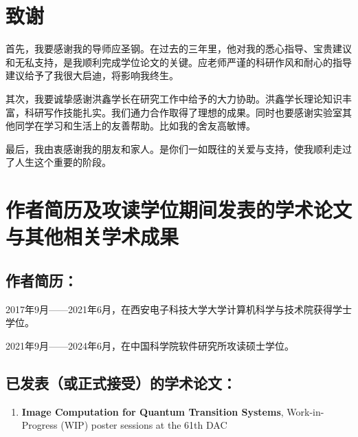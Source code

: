 \chapter[致谢]{致\quad 谢}%

首先，我要感谢我的导师应圣钢。在过去的三年里，他对我的悉心指导、宝贵建议和无私支持，是我顺利完成学位论文的关键。应老师严谨的科研作风和耐心的指导建议给予了我很大启迪，将影响我终生。

其次，我要诚挚感谢洪鑫学长在研究工作中给予的大力协助。洪鑫学长理论知识丰富，科研写作技能扎实。我们通力合作取得了理想的成果。同时也要感谢实验室其他同学在学习和生活上的友善帮助。比如我的舍友高敏博。

最后，我由衷感谢我的朋友和家人。是你们一如既往的关爱与支持，使我顺利走过了人生这个重要的阶段。

\chapter{作者简历及攻读学位期间发表的学术论文与其他相关学术成果}

\section*{作者简历：}
2017年9月——2021年6月，在西安电子科技大学大学计算机科学与技术院获得学士学位。


2021年9月——2024年6月，在中国科学院软件研究所攻读硕士学位。


\section*{已发表（或正式接受）的学术论文：}

{
\setlist[enumerate]{}%
\begin{enumerate}[nosep]
    \item \textbf{Image Computation for Quantum Transition Systems},  Work-in-Progress (WIP) poster sessions at the 61th DAC
\end{enumerate}
}





\cleardoublepage[plain]%
